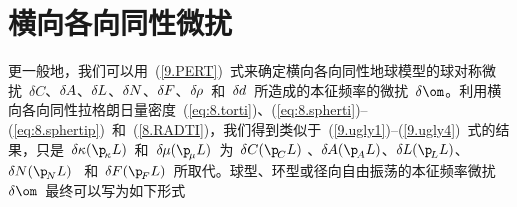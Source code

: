 \renewcommand{\thesection}{$\!\!\!\raise1.3ex\hbox{$\star$}\!\!$
\arabic{chapter}.\arabic{section}}
\section{横向各向同性微扰}
%
\renewcommand{\thesection}{\arabic{chapter}.\arabic{section}}

更一般地，我们可以用~(\ref{9.PERT})~式来确定横向各向同性地球模型的球对称微扰~$\delta C$、$\delta\hspace{-0.2 mm}A$、$\delta\hspace{-0.1 mm}L$、$\delta\hspace{-0.1 mm}N$、$\delta\hspace{-0.1 mm}F$、$\delta\hspace{-0.2 mm}\rho$~和~$\delta\hspace{-0.1 mm}d$~所造成的本征频率的微扰~$\delta\om$。利用横向各向同性拉格朗日量密度~(\ref{eq:8.torti})、(\ref{eq:8.spherti})--(\ref{eq:8.sphertip})~和~(\ref{8.RADTI})，我们得到类似于~(\ref{9.ugly1})--(\ref{9.ugly4})~式的结果，只是~$\delta\hspace{-0.1 mm}\kappa(\p_{\hspace{-0.4 mm}\kappa}L)$~和~$\delta\hspace{-0.2 mm}\mu(\p_{\hspace{-0.4 mm}\mu}L)$~为~$\delta C(\p_{\hspace{-0.4 mm}C}L)$
、$\delta\hspace{-0.2 mm}A(\p_{\hspace{-0.4 mm}A}L)$、$\delta\hspace{-0.1 mm}L(\p_{\hspace{-0.4 mm}L}L)$、$\delta\hspace{-0.1 mm}N(\p_{\hspace{-0.4 mm}N}L)$~ 和~$\delta\hspace{-0.1 mm}F(\p_{\hspace{-0.4 mm}F}L)$~所取代。球型、环型或径向自由振荡的本征频率微扰~$\delta\om$~最终可以写为如下形式
\eqa
{}
